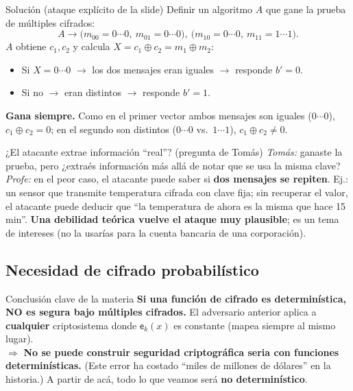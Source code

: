 \documentclass[11pt,a4paper]{article}
\newcommand{\xor}{\oplus}
\newcommand{\E}{\mathsf{e}}
\begin{document}
\begin{practbox}{Solución (ataque explícito de la slide)}
Definir un algoritmo $A$ que gane la prueba de múltiples cifrados:
\[
  A \to \big(m_{00}=0\cdots0,\ m_{01}=0\cdots0\big),\ \big(m_{10}=0\cdots0,\ m_{11}=1\cdots1\big).
\]
$A$ obtiene $c_1,c_2$ y calcula $X = c_1\xor c_2 = m_1\xor m_2$:
\begin{itemize}[leftmargin=1.3em,itemsep=1pt]
  \item Si $X = 0\cdots0$ $\to$ los dos mensajes eran iguales $\to$ responde $b'=0$.
  \item Si no $\to$ eran distintos $\to$ responde $b'=1$.
\end{itemize}
\textbf{Gana siempre.} Como en el primer vector ambos mensajes son iguales ($0\cdots0$),
$c_1\xor c_2=0$; en el segundo son distintos ($0\cdots0$ vs.\ $1\cdots1$), $c_1\xor c_2\neq0$.
\end{practbox}

\begin{practbox}{¿El atacante extrae información ``real''? (pregunta de Tomás)}
\emph{Tomás:} ganaste la prueba, pero ¿extraés información más allá de notar que se usa la
misma clave? \emph{Profe:} en el peor caso, el atacante puede saber si \textbf{dos
mensajes se repiten}. Ej.: un sensor que transmite temperatura cifrada con clave fija;
sin recuperar el valor, el atacante puede deducir que ``la temperatura de ahora es la
misma que hace 15 min''. \textbf{Una debilidad teórica vuelve el ataque muy plausible};
es un tema de intereses (no la usarías para la cuenta bancaria de una corporación).
\end{practbox}

\subsection{Necesidad de cifrado probabilístico}

\begin{warnbox}{Conclusión clave de la materia}
\textbf{Si una función de cifrado es determinística, NO es segura bajo múltiples
cifrados.} El adversario anterior aplica a \textbf{cualquier} criptosistema donde
$\E_k(x)$ es constante (mapea siempre al mismo lugar).\\[4pt]
$\Rightarrow$ \textbf{No se puede construir seguridad criptográfica seria con funciones
determinísticas.} (Este error ha costado ``miles de millones de dólares'' en la historia.)
A partir de acá, todo lo que veamos será \textbf{no determinístico}.
\end{warnbox}
\end{document}
